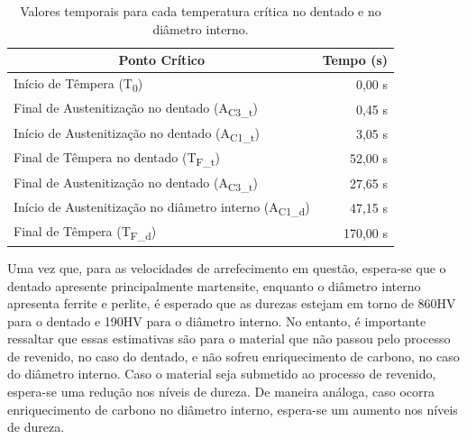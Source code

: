 \begin{table}[htb]
    \centering
    \caption[Valores temporais para cada temperatura crítica]{Valores temporais para cada temperatura crítica no dentado e no diâmetro interno.}
    \label{tab:pontos_sim}
    \begin{tabular}{lr} 
    \toprule
    \multicolumn{1}{c}{\textbf{Ponto Crítico}}            & \multicolumn{1}{c}{\textbf{Tempo (s)}}                         \\ 
    \hline\hline
    Início de Têmpera (T\textsubscript{0})                                & 0,00 s                                         \\ 
    \hline
    Final de Austenitização no dentado (A\textsubscript{C3\_t})           & 0,45 s                                         \\
    Início de Austenitização no dentado (A\textsubscript{C1\_t})          & 3,05 s                                         \\
    Final de Têmpera no dentado (T\textsubscript{F\_t})                   & 52,00 s                                        \\ 
    \hline\hline
    Final de Austenitização no dentado (A\textsubscript{C3\_t})           & 27,65 s                                        \\
    Início de Austenitização no diâmetro interno (A\textsubscript{C1\_d}) & 47,15 s                                        \\ 
    Final de Têmpera (T\textsubscript{F\_d})                              & 170,00 s                                       \\
    \bottomrule
    \end{tabular}
\end{table}
\par
Uma vez que, para as velocidades de arrefecimento em questão, espera-se que o dentado apresente principalmente martensite, enquanto o diâmetro interno apresenta ferrite e perlite, é esperado que as durezas estejam em torno de 860HV para o dentado e 190HV para o diâmetro interno. No entanto, é importante ressaltar que essas estimativas são para o material que não passou pelo processo de revenido, no caso do dentado, e não sofreu enriquecimento de carbono, no caso do diâmetro interno. Caso o material seja submetido ao processo de revenido, espera-se uma redução nos níveis de dureza. De maneira análoga, caso ocorra enriquecimento de carbono no diâmetro interno, espera-se um aumento nos níveis de dureza.

